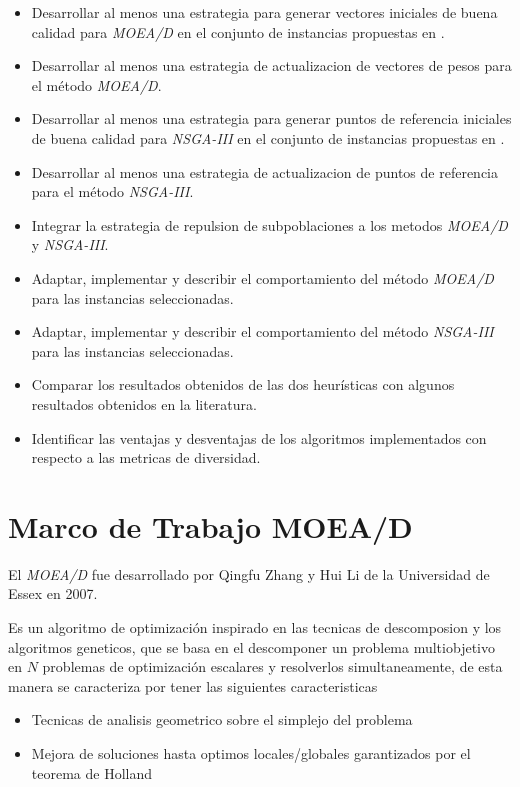 \documentclass[letterpaper,10pt]{article}
\begin{document}
\begin{itemize}
\item Desarrollar al menos una estrategia para generar vectores iniciales de buena calidad para \emph{MOEA/D} en el conjunto de instancias propuestas en \cite{zhang2008multiobjective}.

\item Desarrollar al menos una estrategia de actualizacion de vectores de pesos para el método \emph{MOEA/D}.

\item Desarrollar al menos una estrategia para generar puntos de referencia iniciales de buena calidad para \emph{NSGA-III} en el conjunto de instancias propuestas en \cite{zhang2008multiobjective}.

\item Desarrollar al menos una estrategia de actualizacion de puntos de referencia para el método \emph{NSGA-III}.

\item Integrar la estrategia de repulsion de subpoblaciones\cite{ahrari2016multimodal} a los metodos \emph{MOEA/D} y \emph{NSGA-III}.

\item Adaptar, implementar y describir el comportamiento del método \emph{MOEA/D} para las instancias seleccionadas.
 
\item Adaptar, implementar y describir el comportamiento del método \emph{NSGA-III} para las instancias seleccionadas.

\item Comparar los resultados obtenidos de las dos heurísticas con algunos resultados obtenidos en la literatura.

\item Identificar las ventajas y desventajas de los algoritmos implementados con respecto a las metricas de diversidad.
\end{itemize}

\section{Marco de Trabajo MOEA/D}
El \emph{MOEA/D} fue desarrollado por Qingfu Zhang y Hui Li de la Universidad de Essex en 2007. \cite{4358754}
 
Es un algoritmo de optimización inspirado en las tecnicas de descomposion y los algoritmos geneticos, que se basa en el descomponer un problema multiobjetivo en $N$ problemas de optimización escalares y resolverlos simultaneamente, de esta manera se caracteriza por tener las siguientes caracteristicas
 \begin{itemize}
 \item Tecnicas de analisis geometrico sobre el simplejo del problema \cite{mie99,Das:1998:NIN:588907.589322, Messac2003}
 \item Mejora de soluciones hasta optimos locales/globales garantizados por el teorema de Holland\cite{Holland:1992:ANA:531075}
 \end{itemize}
 
\end{document}
